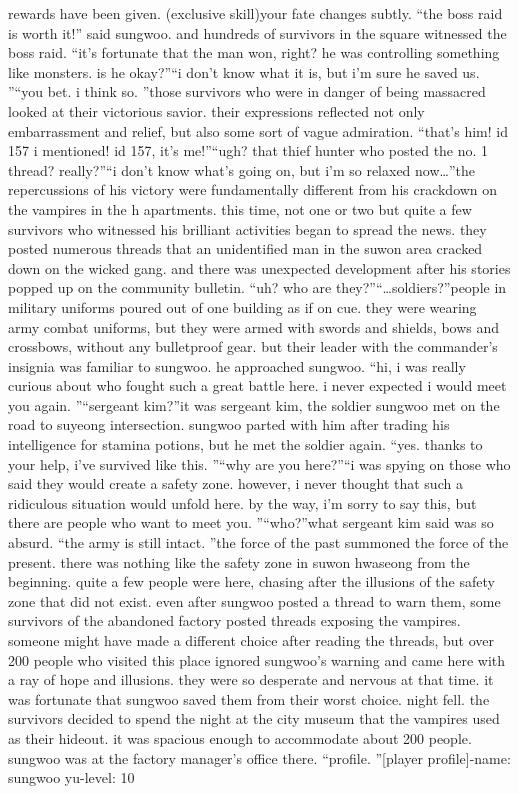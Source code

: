 rewards have been given.
 (exclusive skill)your fate changes subtly.
“the boss raid is worth it!” said sungwoo.
and hundreds of survivors in the square witnessed the boss raid.
“it’s fortunate that the man won, right? he was controlling something like monsters.
 is he okay?”“i don’t know what it is, but i’m sure he saved us.
”“you bet.
 i think so.
”those survivors who were in danger of being massacred looked at their victorious savior.
their expressions reflected not only embarrassment and relief, but also some sort of vague admiration.
“that’s him! id 157 i mentioned! id 157, it’s me!”“ugh? that thief hunter who posted the no.
 1 thread? really?”“i don’t know what’s going on, but i’m so relaxed now…”the repercussions of his victory were fundamentally different from his crackdown on the vampires in the h apartments.
 this time, not one or two but quite a few survivors who witnessed his brilliant activities began to spread the news.
 they posted numerous threads that an unidentified man in the suwon area cracked down on the wicked gang.
and there was unexpected development after his stories popped up on the community bulletin.
“uh? who are they?”“…soldiers?”people in military uniforms poured out of one building as if on cue.
 they were wearing army combat uniforms, but they were armed with swords and shields, bows and crossbows, without any bulletproof gear.
 but their leader with the commander’s insignia was familiar to sungwoo.
 he approached sungwoo.
“hi, i was really curious about who fought such a great battle here.
 i never expected i would meet you again.
”“sergeant kim?”it was sergeant kim, the soldier sungwoo met on the road to suyeong intersection.
sungwoo parted with him after trading his intelligence for stamina potions, but he met the soldier again.
“yes.
 thanks to your help, i’ve survived like this.
”“why are you here?”“i was spying on those who said they would create a safety zone.
 however, i never thought that such a ridiculous situation would unfold here.
 by the way, i’m sorry to say this, but there are people who want to meet you.
”“who?”what sergeant kim said was so absurd.
“the army is still intact.
”the force of the past summoned the force of the present.
there was nothing like the safety zone in suwon hwaseong from the beginning.
quite a few people were here, chasing after the illusions of the safety zone that did not exist.
 even after sungwoo posted a thread to warn them, some survivors of the abandoned factory posted threads exposing the vampires.
 someone might have made a different choice after reading the threads, but over 200 people who visited this place ignored sungwoo’s warning and came here with a ray of hope and illusions.
 they were so desperate and nervous at that time.
it was fortunate that sungwoo saved them from their worst choice.
night fell.
 the survivors decided to spend the night at the city museum that the vampires used as their hideout.
 it was spacious enough to accommodate about 200 people.
sungwoo was at the factory manager’s office there.
“profile.
”[player profile]-name: sungwoo yu-level: 10


